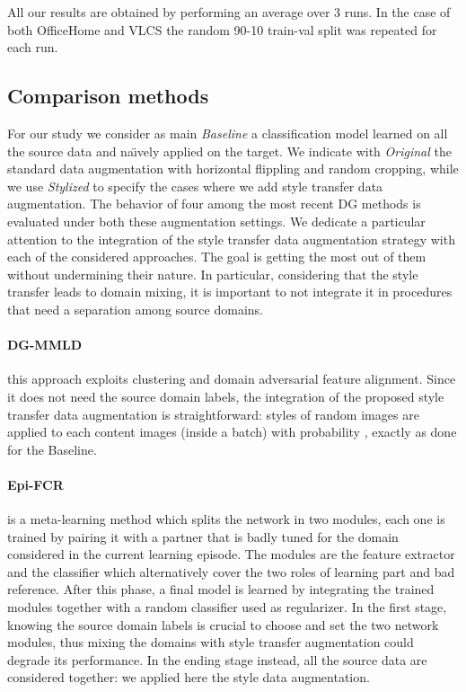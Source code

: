 All our results are obtained by performing an average over 3 runs. In the case of both OfficeHome and VLCS the random 90-10 train-val split was repeated for each run.


\subsection{Comparison methods}
For our study we consider as main \emph{Baseline} a classification model learned on all the source data and na\"{\i}vely applied on the target. We indicate with \emph{Original} the standard data augmentation with horizontal flippling and random cropping, while we use \emph{Stylized} to specify the cases where we add style transfer data augmentation.
The behavior of four among the most recent DG methods is evaluated under both these augmentation settings. We dedicate a particular attention to the integration of the style transfer data augmentation strategy with each of the considered approaches. The goal is getting the most out of them without undermining their nature. In particular, considering that the style transfer leads to domain mixing, it is important to not integrate it in procedures that need a separation among source domains.
\paragraph{DG-MMLD~\cite{dg_mmld}} this approach exploits clustering and domain adversarial feature alignment. Since it does not need the source domain labels, the integration of the proposed style transfer data augmentation is straightforward: styles of random images are applied to each content images (inside a batch) with probability , exactly as done for the Baseline.
\paragraph{Epi-FCR~\cite{episodic_hospedales}} is a meta-learning method which splits the network in two modules, each one is trained by pairing it with a partner that is badly tuned for the domain considered in the current learning episode. The modules are the feature extractor and the classifier which alternatively cover the two roles of learning part and bad reference. After this phase, a final model is learned by integrating the trained modules together with a random classifier used as regularizer. In the first stage, knowing the source domain labels is crucial to choose and set the two network modules, thus mixing the domains with style transfer augmentation could degrade its performance. In the ending stage instead, all the source data are considered together: we applied here the style data augmentation.  
